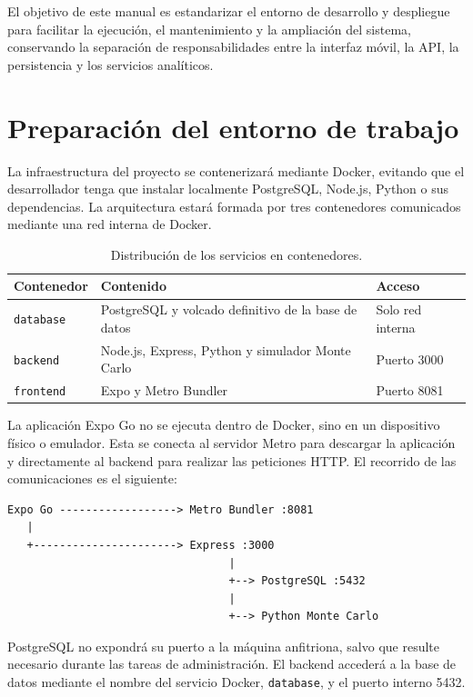 El objetivo de este manual es estandarizar el entorno de desarrollo y despliegue
para facilitar la ejecuci\'on, el mantenimiento y la ampliaci\'on del sistema,
conservando la separaci\'on de responsabilidades entre la interfaz m\'ovil, la API,
la persistencia y los servicios anal\'iticos.

\section{Preparaci\'on del entorno de trabajo}

La infraestructura del proyecto se contenerizar\'a mediante Docker, evitando que
el desarrollador tenga que instalar localmente PostgreSQL, Node.js, Python o sus
dependencias. La arquitectura estar\'a formada por tres contenedores comunicados
mediante una red interna de Docker.

\begin{table}[H]
\centering
\caption{Distribuci\'on de los servicios en contenedores.}
\label{tab:contenedores}
\begin{tabular}{|p{2.6cm}|p{8.2cm}|p{3cm}|}
\hline
\textbf{Contenedor} & \textbf{Contenido} & \textbf{Acceso} \\
\hline
\texttt{database} & PostgreSQL y volcado definitivo de la base de datos & Solo red interna \\
\hline
\texttt{backend} & Node.js, Express, Python y simulador Monte Carlo & Puerto 3000 \\
\hline
\texttt{frontend} & Expo y Metro Bundler & Puerto 8081 \\
\hline
\end{tabular}
\end{table}

La aplicaci\'on Expo Go no se ejecuta dentro de Docker, sino en un dispositivo
f\'isico o emulador. Esta se conecta al servidor Metro para descargar la aplicaci\'on
y directamente al backend para realizar las peticiones HTTP. El recorrido de las
comunicaciones es el siguiente:

\begin{lstlisting}
Expo Go ------------------> Metro Bundler :8081
   |
   +----------------------> Express :3000
                                  |
                                  +--> PostgreSQL :5432
                                  |
                                  +--> Python Monte Carlo
\end{lstlisting}

PostgreSQL no expondr\'a su puerto a la m\'aquina anfitriona, salvo que resulte
necesario durante las tareas de administraci\'on. El backend acceder\'a a la base de
datos mediante el nombre del servicio Docker, \texttt{database}, y el puerto
interno 5432.

